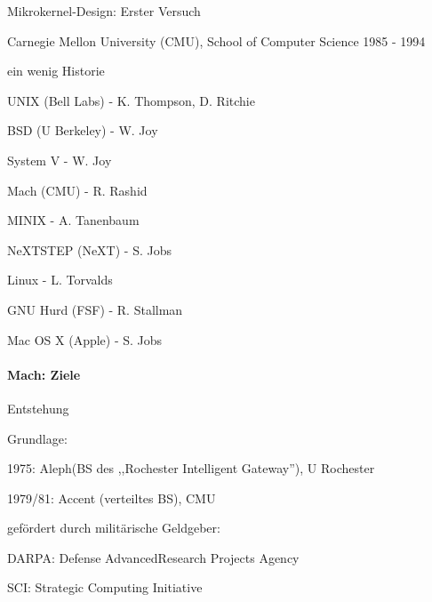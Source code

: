 \documentclass[a4paper]{article}
\begin{document}
\begin{multicols}{3}
    \begin{itemize*}
        \item
        Mikrokernel-Design: Erster Versuch
        \begin{itemize*}
            \item Carnegie Mellon University (CMU), School of Computer Science 1985 - 1994
        \end{itemize*}
        \item
        ein wenig Historie
        \begin{itemize*}
            \item UNIX (Bell Labs) - K. Thompson, D. Ritchie
            \item BSD (U Berkeley) - W. Joy
            \item System V - W. Joy
            \item Mach (CMU) - R. Rashid
            \item MINIX - A. Tanenbaum
            \item NeXTSTEP (NeXT) - S. Jobs
            \item Linux - L. Torvalds
            \item GNU Hurd (FSF) - R. Stallman
            \item Mac OS X (Apple) - S. Jobs
        \end{itemize*}
    \end{itemize*}


    \paragraph{Mach: Ziele}

    Entstehung

    \begin{itemize*}
        \item
        Grundlage:
        \begin{itemize*}
            \item 1975: Aleph(BS des ,,Rochester Intelligent Gateway''), U Rochester
            \item 1979/81: Accent (verteiltes BS), CMU
        \end{itemize*}
        \item
        gefördert durch militärische Geldgeber:
        \begin{itemize*}
            \item DARPA: Defense AdvancedResearch Projects Agency
            \item SCI: Strategic Computing Initiative
        \end{itemize*}
    \end{itemize*}


\end{multicols}
\end{document}
